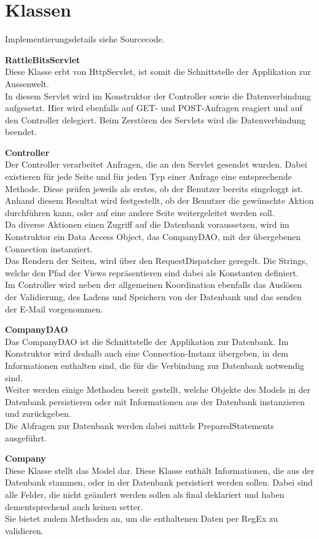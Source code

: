 \documentclass[12pt]{scrartcl}
\begin{document}
\section{Klassen}
Implementierungsdetails siehe Sourcecode.

\textbf{RattleBitsServlet}\\
Diese Klasse erbt von HttpServlet, ist somit die Schnittstelle der Applikation zur Aussenwelt.\\
In diesem Servlet wird im Konstruktor der Controller sowie die Datenverbindung aufgesetzt. Hier wird ebenfalls auf GET- und POST-Anfragen reagiert und auf den Controller delegiert. Beim Zerstören des Servlets wird die Datenverbindung beendet.

\textbf{Controller}\\
Der Controller verarbeitet Anfragen, die an den Servlet gesendet wurden. Dabei existieren für jede Seite und für jeden Typ einer Anfrage eine entsprechende Methode. Diese prüfen jeweils als erstes, ob der Benutzer bereits eingeloggt ist. Anhand diesem Resultat wird festgestellt, ob der Benutzer die gewünschte Aktion durchführen kann, oder auf eine andere Seite weitergeleitet werden soll.\\
Da diverse Aktionen einen Zugriff auf die Datenbank voraussetzen, wird im Konstruktor ein Data Access Object, das CompanyDAO, mit der übergebenen Connection instanziert.\\
Das Rendern der Seiten, wird über den RequestDispatcher geregelt. Die Strings, welche den Pfad der Views repräsentieren sind dabei als Konstanten definiert.\\
Im Controller wird neben der allgemeinen Koordination ebenfalls das Auslösen der Validierung, des Ladens und Speichern von der Datenbank und das senden der E-Mail vorgenommen.

\textbf{CompanyDAO}\\
Das CompanyDAO ist die Schnittstelle der Applikation zur Datenbank. Im Konstruktor wird deshalb auch eine Connection-Instanz übergeben, in dem Informationen enthalten sind, die für die Verbindung zur Datenbank notwendig sind.\\
Weiter werden einige Methoden bereit gestellt, welche Objekte des Models in der Datenbank persistieren oder mit Informationen aus der Datenbank instanzieren und zurückgeben.\\
Die Abfragen zur Datenbank werden dabei mittels PreparedStatements ausgeführt.

\textbf{Company}\\
Diese Klasse stellt das Model dar. Diese Klasse enthält Informationen, die aus der Datenbank stammen, oder in der Datenbank persistiert werden sollen. Dabei sind alle Felder, die nicht geändert werden sollen als final deklariert und haben dementsprechend auch keinen setter.\\
Sie bietet zudem Methoden an, um die enthaltenen Daten per RegEx zu validieren.
\end{document}
